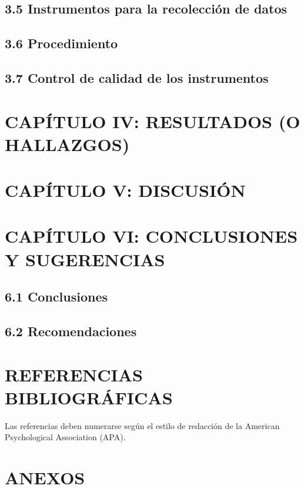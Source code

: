 \documentclass[12pt]{../componentes/uns}
\begin{document}
\subsection{3.5 Instrumentos para la recolección de datos}
\lipsum[19]

\subsection{3.6 Procedimiento}
\lipsum[20]

\subsection{3.7 Control de calidad de los instrumentos}
\lipsum[21]

\newpage
\section{CAPÍTULO IV: RESULTADOS (O HALLAZGOS)}
\lipsum[22]

\newpage
\section{CAPÍTULO V: DISCUSIÓN}
\lipsum[23]

\newpage
\section{CAPÍTULO VI: CONCLUSIONES Y SUGERENCIAS}
\subsection{6.1 Conclusiones}
\lipsum[24]

\subsection{6.2 Recomendaciones}
\lipsum[25]

\newpage
\section*{REFERENCIAS BIBLIOGRÁFICAS}
Las referencias deben numerarse según el estilo de redacción de la American Psychological Association (APA).

\newpage
\section*{ANEXOS}
\lipsum[26]
\end{document}
